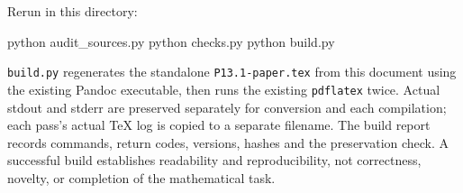 \documentclass[
  11pt,
]{article}
\newenvironment{Shaded}{}{}
\newcommand{\ExtensionTok}[1]{#1}
\newcommand{\NormalTok}[1]{#1}
\begin{document}
Rerun in this directory:

\begin{Shaded}
\begin{Highlighting}[]
\ExtensionTok{python}\NormalTok{ audit\_sources.py}
\ExtensionTok{python}\NormalTok{ checks.py}
\ExtensionTok{python}\NormalTok{ build.py}
\end{Highlighting}
\end{Shaded}

\texttt{build.py} regenerates the standalone \texttt{P13.1-paper.tex}
from this document using the existing Pandoc executable, then runs the
existing \texttt{pdflatex} twice. Actual stdout and stderr are preserved
separately for conversion and each compilation; each pass's actual TeX
log is copied to a separate filename. The build report records commands,
return codes, versions, hashes and the preservation check. A successful
build establishes readability and reproducibility, not correctness,
novelty, or completion of the mathematical task.
\end{document}
